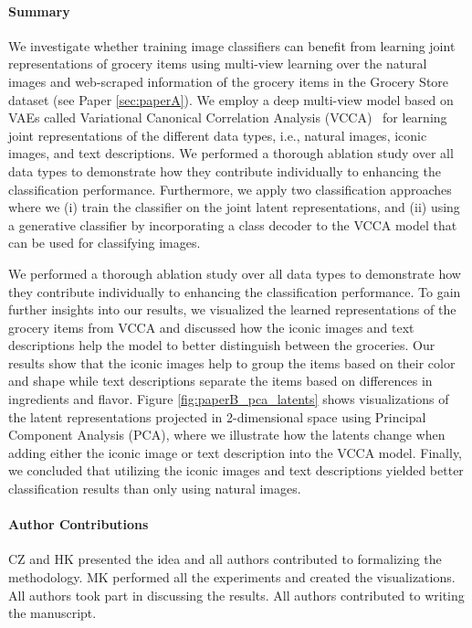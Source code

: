 \paragraph{Summary} 
We investigate whether training image classifiers can benefit from learning joint representations of grocery items using multi-view learning over the natural images and web-scraped information of the grocery items in the Grocery Store dataset (see Paper \ref{sec:paperA}). We employ a deep multi-view model based on VAEs called Variational Canonical Correlation Analysis (VCCA)~\cite{wang2016deep} for learning joint representations of the different data types, i.e., natural images, iconic images, and text descriptions. We performed a thorough ablation study over all data types to demonstrate how they contribute individually to enhancing the classification performance. Furthermore, we apply two classification approaches where we (i) train the classifier on the joint latent representations, and (ii) using a generative classifier by incorporating a class decoder to the VCCA model that can be used for classifying images. 

We performed a thorough ablation study over all data types to demonstrate how they contribute individually to enhancing the classification performance. To gain further insights into our results, we visualized the learned representations of the grocery items from VCCA and discussed how the iconic images and text descriptions help the model to better distinguish between the groceries. Our results show that the iconic images help to group the items based on their color and shape while text descriptions separate the items based on differences in ingredients and flavor. Figure \ref{fig:paperB_pca_latents} shows visualizations of the latent representations projected in 2-dimensional space using Principal Component Analysis (PCA), where we illustrate how the latents change when adding either the iconic image or text description into the VCCA model. Finally, we concluded that utilizing the iconic images and text descriptions yielded better classification results than only using natural images. 


\paragraph{Author Contributions} 
CZ and HK presented the idea and all authors contributed to formalizing the methodology. 
MK performed all the experiments and created the visualizations. 
All authors took part in discussing the results.
All authors contributed to writing the manuscript. 


